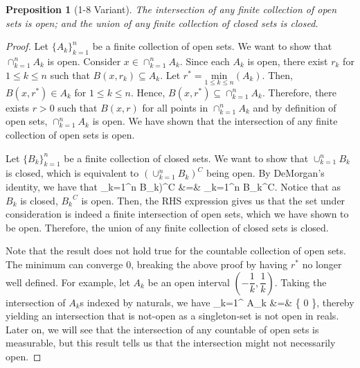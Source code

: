 \documentclass{article} %
\def\eQb#1\eQe{\begin{eqnarray*}#1\end{eqnarray*}}
\theoremstyle{quest}
\newtheorem*{preposition}{Preposition}
\begin{document}
\begin{preposition}[1-8 Variant]
The intersection of any finite collection of open sets is open; and the union of any finite
collection of closed sets is closed.
\end{preposition}
\begin{proof} Let $\{ A_k \}_{k=1}^{n}$ be a finite collection of open sets. We want to show
that $\cap_{k=1}^{n} A_k$ is open. Consider $x \in \cap_{k=1}^{n} A_k$. Since each $A_k$ is open, 
there exist $r_k$ for $1 \leq k \leq n$ such that $B(x,r_k) \subseteq A_k$. Let $r^* = 
\underset{1 \leq k 
\leq n}{\text{min}}( A_k )$. Then, $B(x,r^*) \in A_k$ for $1 \leq k \leq n$. Hence,
$B(x,r^*) \subseteq \cap_{k=1}^{n} A_k$. Therefore, there exists $r > 0$ such that
$B(x,r)$ for all points in $\cap_{k=1}^{n} A_k$ and by definition of open sets,
$\cap_{k=1}^{n} A_k$ is open. 
We have shown that the intersection of any finite collection of open sets is open. \\

\smallskip

Let $\{ B_k \}_{k=1}^{n}$ be a finite
collection of closed sets. We want to show that $\cup_{k=1}^{n} B_k$ is closed, which is 
equivalent to $(\cup_{k=1}^{n} B_k)^{C}$ being open. By DeMorgan's identity, we have that
\eQb
(\cup_{k=1}^{n} B_k)^{C} &=& \cap_{k=1}^{n} {B_k}^{C}.
\eQe
Notice that as $B_k$ is closed, ${B_k}^{C}$ is open. Then, 
the RHS expression gives us that the set under consideration is indeed a finite
intersection of open sets, which we have shown to be open. Therefore, the union 
of any finite collection of closed sets is closed. \\

\smallskip

Note that the result does not hold true for the countable collection of open sets. The minimum can
converge $0$, breaking the above proof by having $r^*$ no longer well defined. For example,
let $A_k$ be an open interval $(-\dfrac{1}{k}, \dfrac{1}{k})$. Taking the intersection of $A_k$s 
indexed by naturals, we have 
\eQb
\cap_{k=1}^{\infty} A_k &=& \{ 0 \},
\eQe
thereby yielding an intersection that is not-open as a singleton-set is not open in reals.
Later on, we will see that the intersection of any countable of open sets is
measurable, but this result
tells us that the intersection might not necessarily open.
\end{proof}

\bigskip
\end{document}
